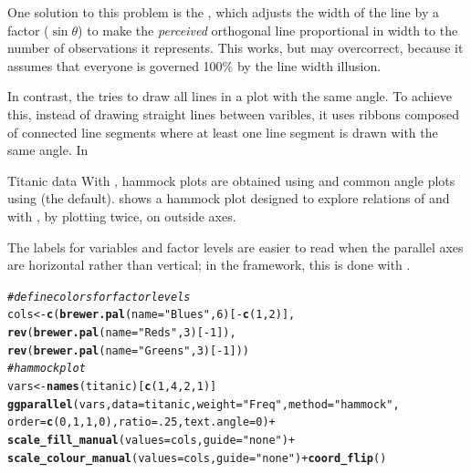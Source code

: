 \documentclass[11pt]{book}\usepackage[]{graphicx}\usepackage[]{color}
\makeatletter
\newcommand{\hlnum}[1]{\textcolor[rgb]{0.686,0.059,0.569}{#1}}%
\newcommand{\hlstr}[1]{\textcolor[rgb]{0.192,0.494,0.8}{#1}}%
\newcommand{\hlcom}[1]{\textcolor[rgb]{0.678,0.584,0.686}{\textit{#1}}}%
\newcommand{\hlopt}[1]{\textcolor[rgb]{0,0,0}{#1}}%
\newcommand{\hlstd}[1]{\textcolor[rgb]{0.345,0.345,0.345}{#1}}%
\newcommand{\hlkwb}[1]{\textcolor[rgb]{0.69,0.353,0.396}{#1}}%
\newcommand{\hlkwc}[1]{\textcolor[rgb]{0.333,0.667,0.333}{#1}}%
\newcommand{\hlkwd}[1]{\textcolor[rgb]{0.737,0.353,0.396}{\textbf{#1}}}%
\newenvironment{kframe}{%
 \def\at@end@of@kframe{}%
 \ifinner\ifhmode%
  \def\at@end@of@kframe{\end{minipage}}%
  \begin{minipage}{\columnwidth}%
 \fi\fi%
 \def\FrameCommand##1{\hskip\@totalleftmargin \hskip-\fboxsep
 \colorbox{shadecolor}{##1}\hskip-\fboxsep
     \hskip-\linewidth \hskip-\@totalleftmargin \hskip\columnwidth}%
 \MakeFramed {\advance\hsize-\width
   \@totalleftmargin\z@ \linewidth\hsize
   \@setminipage}}%
 {\par\unskip\endMakeFramed%
 \at@end@of@kframe}
\newenvironment{knitrout}{}{} %
\renewenvironment{knitrout}{\small\renewcommand{\baselinestretch}{.85}}{} %
\makeatother
\begin{document}
One solution to this problem is the 
\citep{Schonlau:2003}, which adjusts the width of the line
by a factor ($\sin \theta$) to make the 
\emph{perceived} orthogonal line
proportional in width  to the number of observations it represents.
This works, but may overcorrect, because it assumes that everyone
is governed 100\% by the line width illusion. 

In contrast, the  \citep{HofmannVendettuoli:2013}
tries to draw all lines in a plot with the same angle.
To achieve this, instead of drawing straight lines between varibles, it
uses ribbons composed of connected line segments where at least one
line segment is drawn with the same angle. In 

\begin{Example}{Titanic data}
With , hammock plots are obtained using 
and common angle plots using  (the default).
 shows a hammock plot designed to explore relations
of  and  with , by plotting 
twice, on outside axes.

The labels for variables and factor levels are easier to read when the 
parallel axes are horizontal rather than vertical;  in the 
framework, this is done with .

\begin{knitrout}
\color{fgcolor}\begin{kframe}
\begin{alltt}
\hlcom{# define colors for factor levels}
\hlstd{cols} \hlkwb{<-} \hlkwd{c}\hlstd{(}\hlkwd{brewer.pal}\hlstd{(}\hlkwc{name}\hlstd{=}\hlstr{"Blues"}\hlstd{,} \hlnum{6}\hlstd{)[}\hlopt{-}\hlkwd{c}\hlstd{(}\hlnum{1}\hlstd{,}\hlnum{2}\hlstd{)],}
          \hlkwd{rev}\hlstd{(}\hlkwd{brewer.pal}\hlstd{(}\hlkwc{name}\hlstd{=}\hlstr{"Reds"}\hlstd{,} \hlnum{3}\hlstd{)[}\hlopt{-}\hlnum{1}\hlstd{]),}
          \hlkwd{rev}\hlstd{(}\hlkwd{brewer.pal}\hlstd{(}\hlkwc{name}\hlstd{=}\hlstr{"Greens"}\hlstd{,}\hlnum{3}\hlstd{)[}\hlopt{-}\hlnum{1}\hlstd{]))}
\hlcom{# hammock plot }
\hlstd{vars} \hlkwb{<-} \hlkwd{names}\hlstd{(titanic)[}\hlkwd{c}\hlstd{(}\hlnum{1}\hlstd{,} \hlnum{4}\hlstd{,} \hlnum{2}\hlstd{,} \hlnum{1}\hlstd{)]}
\hlkwd{ggparallel}\hlstd{(vars,} \hlkwc{data}\hlstd{=titanic,} \hlkwc{weight}\hlstd{=}\hlstr{"Freq"}\hlstd{,} \hlkwc{method}\hlstd{=}\hlstr{"hammock"}\hlstd{,}
          \hlkwc{order}\hlstd{=}\hlkwd{c}\hlstd{(}\hlnum{0}\hlstd{,}\hlnum{1}\hlstd{,}\hlnum{1}\hlstd{,}\hlnum{0}\hlstd{),} \hlkwc{ratio}\hlstd{=}\hlnum{.25}\hlstd{,} \hlkwc{text.angle}\hlstd{=}\hlnum{0}\hlstd{)} \hlopt{+}
  \hlkwd{scale_fill_manual}\hlstd{(}\hlkwc{values}\hlstd{=cols,} \hlkwc{guide}\hlstd{=}\hlstr{"none"}\hlstd{)} \hlopt{+}
  \hlkwd{scale_colour_manual}\hlstd{(}\hlkwc{values}\hlstd{=cols,} \hlkwc{guide}\hlstd{=}\hlstr{"none"}\hlstd{)} \hlopt{+} \hlkwd{coord_flip}\hlstd{()}
\end{alltt}



\end{kframe}
\end{knitrout}
\end{Example}
\end{document}
